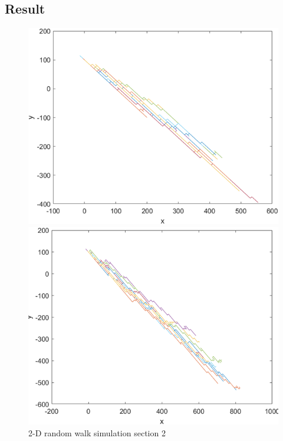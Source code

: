 \documentclass{article}
\begin{document}
\begin{multicols}{2}
\subsection{Result}
\begin{figure}[ht]
\begin{minipage}{0.45\linewidth}
\centering
\includegraphics[width=0.8\linewidth]{graph/2ds1.png} 
\caption{2-D random walk simulation section 1}
\label{2ds1}
\end{minipage}
\hfill
\begin{minipage}{0.45\linewidth}
\centering
\includegraphics[width=0.8\linewidth]{graph/2ds2.png} 
\caption{2-D random walk simulation section 2}
\label{2ds2}
\end{minipage}
\end{figure}
\begin{figure}[ht]
\begin{minipage}{0.45\linewidth}
\centering

\end{minipage}
\end{figure}
\end{multicols}
\end{document}
